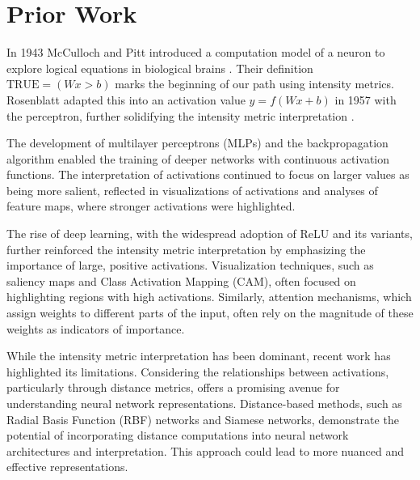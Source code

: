 \section{Prior Work}

In 1943 McCulloch and Pitt introduced a computation model of a neuron to explore logical equations in biological brains \citep{mcculloch1943logical}. Their definition $\text{TRUE} = (Wx > b)$ marks the beginning of our path using intensity metrics. Rosenblatt adapted this into an activation value $y = f(Wx + b)$ in 1957 with the perceptron, further solidifying the intensity metric interpretation \citep{rosenblatt1957perceptron}.

The development of multilayer perceptrons (MLPs) and the backpropagation algorithm enabled the training of deeper networks with continuous activation functions. \citep{rumelhart1986learning,lecun1989backpropagation,hornik1989multilayer} The interpretation of activations continued to focus on larger values as being more salient, reflected in visualizations of activations and analyses of feature maps, where stronger activations were highlighted. \citep{zeiler2014visualizing,yosinski2015understanding,olah2017feature,erhan2009visualizing}

The rise of deep learning, with the widespread adoption of ReLU and its variants, further reinforced the intensity metric interpretation by emphasizing the importance of large, positive activations. \citep{nair2010rectified,glorot2011deep} Visualization techniques, such as saliency maps and Class Activation Mapping (CAM), often focused on highlighting regions with high activations. \citep{simonyan2013deep,zhou2016learning} Similarly, attention mechanisms, which assign weights to different parts of the input, often rely on the magnitude of these weights as indicators of importance. \citep{bahdanau2014neural,vaswani2017attention}

While the intensity metric interpretation has been dominant, recent work has highlighted its limitations. \citep{rudin2019stop} Considering the relationships between activations, particularly through distance metrics, offers a promising avenue for understanding neural network representations. \citep{goodfellow2014explaining,madry2017towards,szegedy2013intriguing} Distance-based methods, such as Radial Basis Function (RBF) networks and Siamese networks, demonstrate the potential of incorporating distance computations into neural network architectures and interpretation. \citep{broomhead1988radial,bromley1994signature,schroff2015facenet} This approach could lead to more nuanced and effective representations.